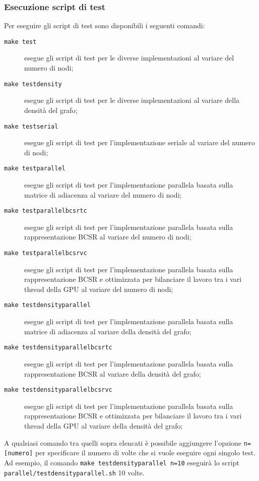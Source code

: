     \subsubsection*{Esecuzione script di test}

        Per eseguire gli script di test sono disponibili i seguenti comandi:
        \begin{description}
            \item[\texttt{make test}] esegue gli script di test per le diverse implementazioni al variare del numero di nodi;
            \item[\texttt{make testdensity}] esegue gli script di test per le diverse implementazioni al variare della densità del grafo;
            \item[\texttt{make testserial}] esegue gli script di test per l'implementazione seriale al variare del numero di nodi;
            \item[\texttt{make testparallel}] esegue gli script di test per l'implementazione parallela basata sulla matrice di adiacenza al variare del numero di nodi;
            \item[\texttt{make testparallelbcsrtc}] esegue gli script di test per l'implementazione parallela basata sulla rappresentazione BCSR al variare del numero di nodi;
            \item[\texttt{make testparallelbcsrvc}] esegue gli script di test per l'implementazione parallela basata sulla rappresentazione BCSR e ottimizzata per bilanciare il lavoro tra i vari thread della GPU al variare del numero di nodi;
            \item[\texttt{make testdensityparallel}] esegue gli script di test per l'implementazione parallela basata sulla matrice di adiacenza al variare della densità del grafo;
            \item[\texttt{make testdensityparallelbcsrtc}] esegue gli script di test per l'implementazione parallela basata sulla rappresentazione BCSR al variare della densità del grafo;
            \item[\texttt{make testdensityparallelbcsrvc}] esegue gli script di test per l'implementazione parallela basata sulla rappresentazione BCSR e ottimizzata per bilanciare il lavoro tra i vari thread della GPU al variare della densità del grafo;
        \end{description}

        A qualsiasi comando tra quelli sopra elencati è possibile aggiungere l'opzione \texttt{n=[numero]} per specificare il numero di volte che si vuole eseguire ogni singolo test. Ad esempio, il comando \texttt{make testdensityparallel n=10} eseguirà lo script \verb|parallel/testdensityparallel.sh| 10 volte.

